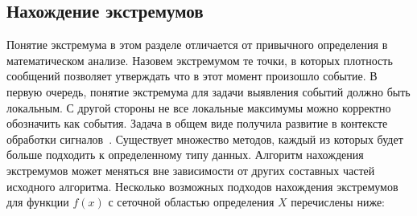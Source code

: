 \documentclass[12pt, a4paper]{article}
\begin{document}
  \subsection{Нахождение экстремумов}
  Понятие экстремума в этом разделе отличается от привычного определения в математическом анализе. Назовем экстремумом те точки, в которых плотность сообщений позволяет утверждать что в этот момент произошло событие. В первую очередь, понятие экстремума для задачи выявления событий должно быть локальным. С другой стороны не все локальные максимумы можно корректно обозначить как события. Задача в общем виде получила развитие в контексте обработки сигналов~\cite{peak-detection}. Существует множество методов, каждый из которых будет больше подходить к определенному типу данных. Алгоритм нахождения экстремумов может меняться вне зависимости от других составных частей исходного алгоритма. Несколько возможных подходов нахождения экстремумов для функции $f(x)$ с сеточной областью определения $X$ перечислены ниже:
\end{document}
